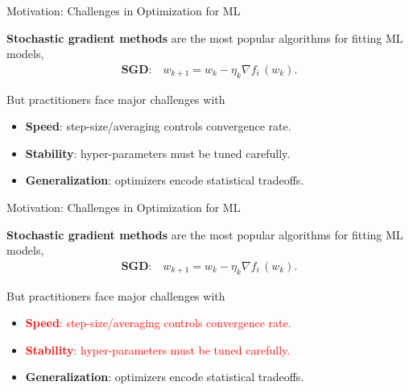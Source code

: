 \documentclass[mathserif,notheorems, hyperref={colorlinks, urlcolor=blue, linkcolor=blue}]{beamer}
\def\\{}%
\begin{document}
    \begin{frame}{Motivation: Challenges in Optimization for ML}

        \textbf{Stochastic gradient methods} are the most popular algorithms for fitting ML models,
        \begin{align*}
            \textbf{SGD:} \quad w_{k + 1} = w_k - \eta_k \nabla f_i \, (w_k). \\
        \end{align*}


        But practitioners face major challenges with \vspace{0.5em}
        \begin{itemize}
            \item \textbf{Speed}: step-size/averaging controls convergence rate.
            \item \textbf{Stability}: hyper-parameters must be tuned carefully.
            \item \textbf{Generalization}: optimizers encode statistical tradeoffs.
        \end{itemize}
        \vspace{1em}

    \end{frame}


    \begin{frame}{Motivation: Challenges in Optimization for ML}

        \textbf{Stochastic gradient methods} are the most popular algorithms for fitting ML models,
        \begin{align*}
            \textbf{SGD:} \quad w_{k + 1} = w_k - \eta_k \nabla f_i \, (w_k). \\
        \end{align*}


        But practitioners face major challenges with \vspace{0.5em}
        \begin{itemize}
            \item \textcolor{red}{\textbf{Speed}: step-size/averaging controls convergence rate.}
            \item \textcolor{red}{\textbf{Stability}: hyper-parameters must be tuned carefully.}
            \item \textbf{Generalization}: optimizers encode statistical tradeoffs.
        \end{itemize}
        \vspace{1em}

    \end{frame}
\end{document}
